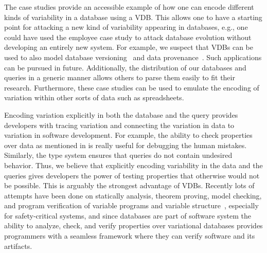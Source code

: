 %
%
The case studies provide an accessible example of how one can encode different 
kinds of variability in a database using a VDB. This allows one to have a 
starting point for attacking a new kind of variability appearing in databases,
e.g., one could have used the employee case study to attack database 
evolution without developing an entirely new system. For example, 
we suspect that VDBs can be used to also model database 
versioning~\cite{datasetVersioning,dbVersioning} and
data provenance~\cite{bt07sigmod}. Such applications can be pursued in future.
%
Additionally, the distribution of our databases and queries in a generic
manner allows others to parse them easily to fit their research.
Furthermore, these case studies can be used to emulate the encoding of 
 variation within other sorts of data such as spreadsheets.
 
 
%
%
Encoding variation explicitly in both the database and the query
provides developers with tracing variation and connecting
the variation in data to variation in software development.
For example,
the ability to check properties over data as mentioned in
 is really useful for debugging the
human mistakes. Similarly, the type system ensures that 
queries do not contain undesired behavior. 
%
Thus, we believe that explicitly
encoding variability in the data and the queries gives developers the 
power of testing properties that otherwise would not be possible. 
This is arguably the strongest advantage of VDBs. Recently
lots of attempts have been done
on statically analysis, theorem proving, model checking, and program verification
of variable programs and 
variable structure~\cite{brkts20vamos, bks11fvoos, ldl07jss, tmbhvs14}, especially 
for safety-critical systems,
 and since databases are part of 
software system the ability to analyze, check, and verify 
properties over variational databases provides programmers
with a seamless framework where they can verify software
and its artifacts.
%


